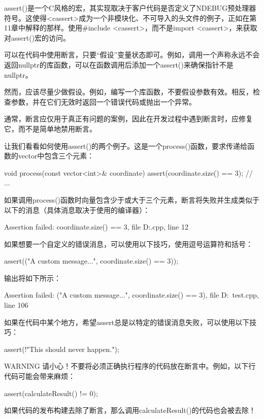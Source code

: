 assert()是一个C风格的宏，其实现取决于客户代码是否定义了NDEBUG预处理器符号。这使得<cassert>成为一个非模块化、不可导入的头文件的例子，正如在第11章中解释的那样。使用\#include <cassert>，而不是import <cassert>，来获取对assert()宏的访问。

可以在代码中使用断言，只要“假设”变量状态即可。例如，调用一个声称永远不会返回nullptr的库函数，可以在函数调用后添加一个assert()来确保指针不是nullptr。

然而，应该尽量少做假设。例如，编写一个库函数，不要假设参数有效。相反，检查参数，并在它们无效时返回一个错误代码或抛出一个异常。

通常，断言应仅用于真正有问题的案例，因此在开发过程中遇到断言时，应修复它，而不是简单地禁用断言。

让我们看看如何使用assert()的两个例子。这是一个process()函数，要求传递给函数的vector中包含三个元素：

\begin{cpp}
void process(const vector<int>& coordinate)
{
    assert(coordinate.size() == 3);
    // ...
}
\end{cpp}

如果调用process()函数时向量包含少于或大于三个元素，断言将失败并生成类似于以下的消息（具体消息取决于使用的编译器）：

\begin{shell}
Assertion failed: coordinate.size() == 3, file D:\test\test.cpp, line 12
\end{shell}

如果想要一个自定义的错误消息，可以使用以下技巧，使用逗号运算符和括号：

\begin{cpp}
assert(("A custom message...", coordinate.size() == 3));
\end{cpp}

输出将如下所示：

\begin{shell}
Assertion failed: ("A custom message...", coordinate.size() == 3), file D:\test\
test.cpp, line 106
\end{shell}

如果在代码中某个地方，希望assert总是以特定的错误消息失败，可以使用以下技巧：

\begin{cpp}
assert(!"This should never happen.");
\end{cpp}

\begin{myWarning}{WARNING}
请小心！不要将必须正确执行程序的代码放在断言中。例如，以下行代码可能会带来麻烦：

\begin{cpp}
assert(calculateResult() != 0);
\end{cpp}

如果代码的发布构建去除了断言，那么调用calculateResult()的代码也会被去除！
\end{myWarning}

